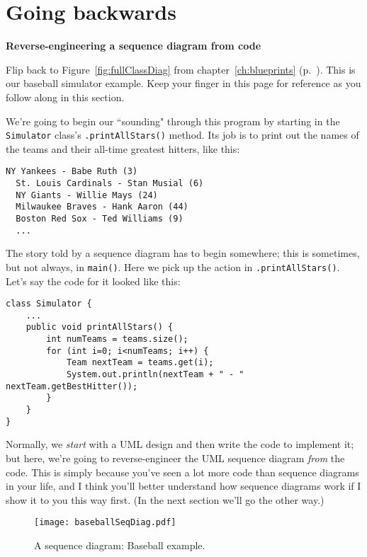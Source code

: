 \section{Going backwards}

\vspace{-.2in}
{\large \textbf{Reverse-engineering a sequence diagram from code}}

Flip back to Figure~\ref{fig:fullClassDiag} from chapter~\ref{ch:blueprints}
(p.~\pageref{fig:fullClassDiag}). This is our baseball simulator example. Keep
your finger in this page for reference as you follow along in this section.

We're going to begin our ``sounding" through this program by starting in the
\texttt{Simulator} class's \texttt{.printAllStars()} method. Its job is to
print out the names of the teams and their all-time greatest hitters, like
this:

\begin{Verbatim}[fontsize=\normalsize,samepage=true,frame=single]
  NY Yankees - Babe Ruth (3)
  St. Louis Cardinals - Stan Musial (6)
  NY Giants - Willie Mays (24)
  Milwaukee Braves - Hank Aaron (44)
  Boston Red Sox - Ted Williams (9)
  ...
\end{Verbatim}

The story told by a sequence diagram has to begin somewhere; this is
sometimes, but not always, in \texttt{main()}. Here we pick up the action in
\texttt{.printAllStars()}. Let's say the code for it looked like this:

\begin{Verbatim}[fontsize=\small,samepage=true,frame=single]
class Simulator {
    ...
    public void printAllStars() {
        int numTeams = teams.size();
        for (int i=0; i<numTeams; i++) {
            Team nextTeam = teams.get(i);
            System.out.println(nextTeam + " - " nextTeam.getBestHitter());
        }
    }
}
\end{Verbatim}

Normally, we \textit{start} with a UML design and then write the code to
implement it; but here, we're going to reverse-engineer the UML sequence
diagram \textit{from} the code. This is simply because you've seen a lot more
code than sequence diagrams in your life, and I think you'll better understand
how sequence diagrams work if I show it to you this way first. (In the next
section we'll go the other way.)

\begin{figure}
\centering
\texttt{[image: baseballSeqDiag.pdf]} %
\vspace{.1in}
\caption{A sequence diagram: Baseball example.}
\label{fig:baseballSeqDiag}
\end{figure}


